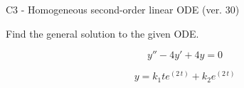 \begin{exercise}
  \begin{exerciseTitle}C3 - Homogeneous second-order linear ODE (ver. 30)\end{exerciseTitle}
  \begin{exerciseStatement}
    
Find the general solution to the given ODE.

    
\[y''-4y'+4y = 0\]

  \end{exerciseStatement}
  \begin{exerciseAnswer}
    
\[y= k_{1} t e^{\left(2 \, t\right)} + k_{2} e^{\left(2 \, t\right)}\]

  \end{exerciseAnswer}
\end{exercise}